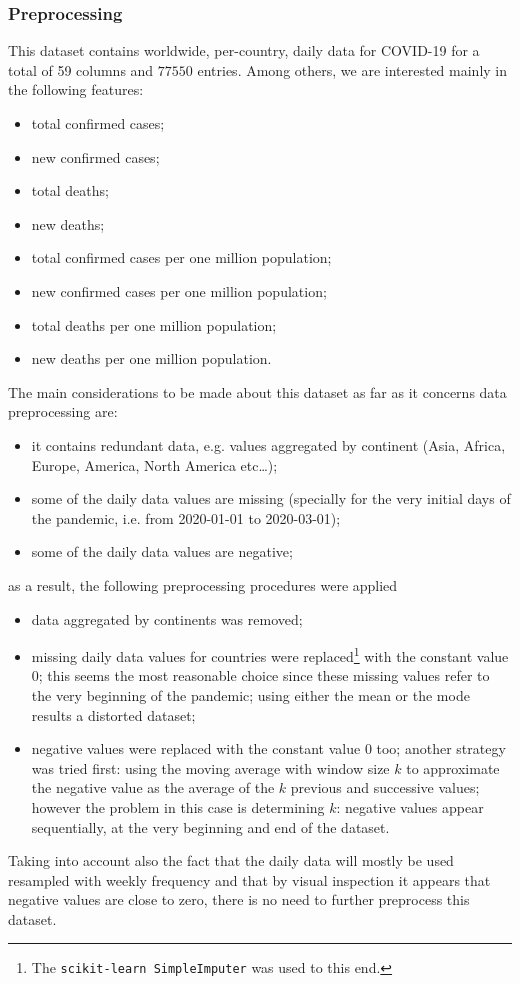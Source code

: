 \documentclass[11pt,a4paper]{article}
\begin{document}
\subsubsection{Preprocessing}
This dataset contains worldwide, per-country, daily data for COVID-19 for a
total of 59 columns and $77550$ entries. Among others, we are interested mainly
in the following features:
\begin{itemize}
    \item total confirmed cases;
    \item new confirmed cases;
    \item total deaths;
    \item new deaths;
    \item total confirmed cases per one million population;
    \item new confirmed cases per one million population;
    \item total deaths per one million population;
    \item new deaths per one million population.
\end{itemize}
The main considerations to be made about this dataset as far as it concerns data
preprocessing are:
\begin{itemize}
    \item it contains redundant data, e.g. values aggregated by continent (Asia,
    Africa, Europe, America, North America etc\dots);
    \item some of the daily data values are missing (specially for the very
    initial days of the pandemic, i.e. from 2020-01-01 to 2020-03-01);
    \item some of the daily data values are negative;
\end{itemize}
as a result, the following preprocessing procedures were applied
\begin{itemize}
    \item data aggregated by continents was removed;
    \item missing daily data values for countries were replaced\footnote{The
    \texttt{scikit-learn SimpleImputer} was used to this end.} with the constant
    value $0$; this seems the most reasonable choice since these missing values
    refer to the very beginning of the pandemic; using either the mean or the
    mode results a distorted dataset;
    \item negative values were replaced with the constant value $0$ too; another
    strategy was tried first: using the moving average with window size $k$ to
    approximate the negative value as the average of the $k$ previous and
    successive values; however the problem in this case is determining $k$:
    negative values appear sequentially, at the very beginning and end of the
    dataset.
\end{itemize}
Taking into account also the fact that the daily data will mostly be used
resampled with weekly frequency and that by visual inspection it appears that
negative values are close to zero, there is no need to further preprocess this
dataset.
\end{document}
